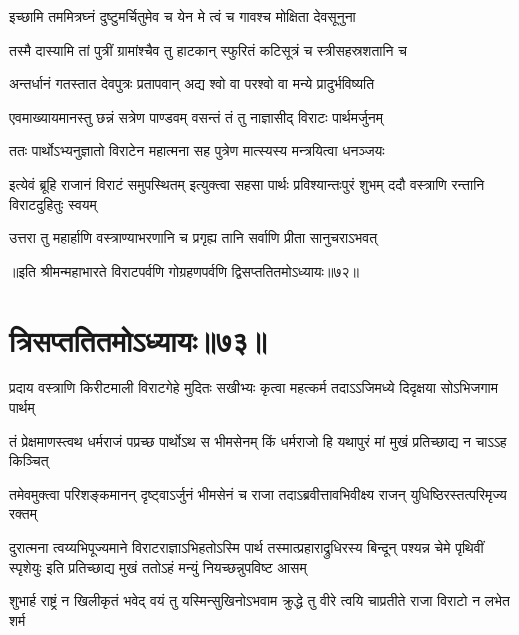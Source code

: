 \twolineshloka
{इच्छामि तममित्रघ्नं दुष्टुमर्चितुमेव च}
{येन मे त्वं च गावश्च मोक्षिता देवसूनुना}


\twolineshloka
{तस्मै दास्यामि तां पुत्रीं ग्रामांश्चैव तु हाटकान्}
{स्फुरितं कटिसूत्रं च स्त्रीसहस्रशतानि च}




\twolineshloka
{अन्तर्धानं गतस्तात देवपुत्रः प्रतापवान्}
{अद्य श्वो वा परश्वो वा मन्ये प्रादुर्भविष्यति}



\twolineshloka
{एवमाख्यायमानस्तु छन्नं सत्रेण पाण्डवम्}
{वसन्तं तं तु नाज्ञासीद् विराटः पार्थमर्जुनम्}


\twolineshloka
{ततः पार्थोऽभ्यनुज्ञातो विराटेन महात्मना}
{सह पुत्रेण मात्स्यस्य मन्त्रयित्वा धनञ्जयः}


\threelineshloka
{इत्येवं ब्रूहि राजानं विराटं समुपस्थितम्}
{इत्युक्त्वा सहसा पार्थः प्रविश्यान्तःपुरं शुभम्}
{ददौ वस्त्राणि रन्तानि विराटदुहितुः स्वयम्}


\twolineshloka
{उत्तरा तु महार्हाणि वस्त्राण्याभरणानि च}
{प्रगृह्य तानि सर्वाणि प्रीता सानुचराऽभवत्}

॥इति श्रीमन्महाभारते विराटपर्वणि गोग्रहणपर्वणि द्विसप्ततितमोऽध्यायः॥७२॥

\chapter{त्रिसप्ततितमोऽध्यायः॥७३॥ }

\fourlineindentedshloka
{प्रदाय वस्त्राणि किरीटमाली}
{विराटगेहे मुदितः सखीभ्यः}
{कृत्वा महत्कर्म तदाऽऽजिमध्ये}
{दिदृक्षया सोऽभिजगाम पार्थम्}


\fourlineindentedshloka
{तं प्रेक्षमाणस्त्वथ धर्मराजं}
{पप्रच्छ पार्थोऽथ स भीमसेनम्}
{किं धर्मराजो हि यथापुरं मां}
{मुखं प्रतिच्छाद्य न चाऽऽह किञ्चित्}


\fourlineindentedshloka
{तमेवमुक्त्वा परिशङ्कमानन्}
{दृष्ट्वाऽर्जुनं भीमसेनं च राजा}
{तदाऽब्रवीत्तावभिवीक्ष्य राजन्}
{युधिष्ठिरस्तत्परिमृज्य रक्तम्}


\sixlineindentedshloka
{दुरात्मना त्वय्यभिपूज्यमाने}
{विराटराज्ञाऽभिहतोऽस्मि पार्थ}
{तस्मात्प्रहाराद्रुधिरस्य बिन्दून्}
{पश्यन्न चेमे पृथिवीं स्पृशेयुः}
{इति प्रतिच्छाद्य मुखं ततोऽहं}
{मन्युं नियच्छन्नुपविष्ट आसम्}


\fourlineindentedshloka
{शुभार्ह राष्ट्रं न खिलीकृतं भवेद्}
{वयं तु यस्मिन्सुखिनोऽभवाम}
{क्रुद्धे तु वीरे त्वयि चाप्रतीते}
{राजा विराटो न लभेत शर्म}


